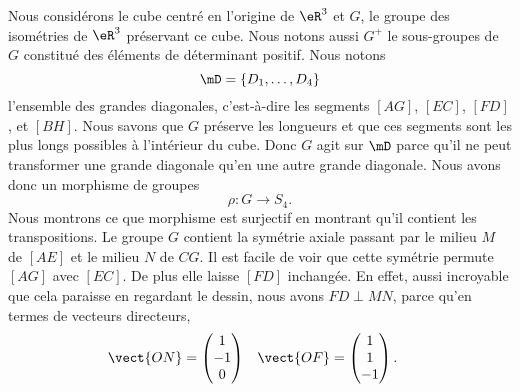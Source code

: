 \begin{wrapfigure}{r}{6.0cm}
   \vspace{-0.5cm}        %
   \centering
   
\end{wrapfigure}
Nous considérons le cube centré en l'origine de \( \eR^3\) et \( G\), le groupe des isométries de \( \eR^3\) préservant ce cube. Nous notons aussi \( G^+\) le sous-groupes de \( G\) constitué des éléments de déterminant positif. Nous notons
\begin{equation}
    \mD=\{ D_1,\ldots, D_4 \}
\end{equation}
l'ensemble des grandes diagonales, c'est-à-dire les segments \( [AG]\), \( [EC]\), \( [FD]\), et \( [BH]\). Nous savons que \( G\) préserve les longueurs et que ces segments sont les plus longs possibles à l'intérieur du cube. Donc \( G\) agit sur \( \mD\) parce qu'il ne peut transformer une grande diagonale qu'en une autre grande diagonale. Nous avons donc un morphisme de groupes
\begin{equation}
    \rho\colon G\to S_4.
\end{equation}
Nous montrons ce que morphisme est surjectif en montrant qu'il contient les transpositions. Le groupe \( G\) contient la symétrie axiale passant par le milieu \( M\) de \( [AE]\) et le milieu \( N\) de \( CG\). Il est facile de voir que cette symétrie permute \( [AG]\) avec \( [EC]\). De plus elle laisse \( [FD]\) inchangée. En effet, aussi incroyable que cela paraisse en regardant le dessin, nous avons \( FD\perp MN\), parce qu'en termes de vecteurs directeurs,
\begin{equation}
    \begin{aligned}[]
        \vect{ ON }&=\begin{pmatrix}
            1    \\
            -1    \\
            0
        \end{pmatrix}&\vect{ OF }&=\begin{pmatrix}
            1    \\
            1    \\
            -1
        \end{pmatrix}.
    \end{aligned}
\end{equation}

